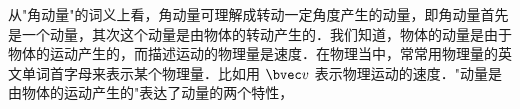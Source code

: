
从"角动量"的词义上看，角动量可理解成转动一定角度产生的动量，即角动量首先是一个动量，其次这个动量是由物体的转动产生的．我们知道，物体的动量是由于物体的运动产生的，而描述运动的物理量是速度．在物理当中，常常用物理量的英文单词首字母来表示某个物理量．比如用 $\bvec v$ 表示物理运动的速度．"动量是由物体的运动产生的"表达了动量的两个特性，